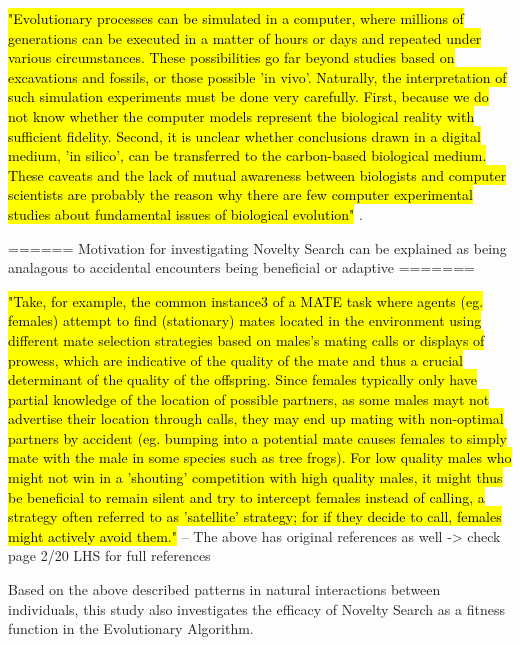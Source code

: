 \hl{"Evolutionary processes can be simulated in a computer, where millions of generations can be executed in a matter of hours or days and repeated under various circumstances. These possibilities go far beyond studies based on excavations and fossils, or those possible 'in vivo'. Naturally, the interpretation of such simulation experiments must be done very carefully. First, because we do not know whether the computer models represent the biological reality with sufficient fidelity. Second, it is unclear whether conclusions drawn in a digital medium, 'in silico', can be transferred to the carbon-based biological medium. These caveats and the lack of mutual awareness between biologists and computer scientists are probably the reason why there are few computer experimental studies about fundamental issues of biological evolution"} \cite{EibenSmith2003}.


====== Motivation for investigating Novelty Search can be explained as being analagous to accidental encounters being beneficial or adaptive =======

\hl{"Take, for example, the common instance3 of a MATE task where agents (eg. females) attempt to find (stationary) mates located in the environment using different mate selection strategies based on males's mating calls or displays of prowess, which are indicative of the quality of the mate and thus a crucial determinant of the quality of the offspring. Since females typically only have partial knowledge of the location of possible partners, as some males mayt not advertise their location through calls, they may end up mating with non-optimal partners by accident (eg. bumping into a potential mate causes females to simply mate with the male in some species such as tree frogs). For low quality males who might not win in a 'shouting' competition with high quality males, it might thus be beneficial to remain silent and try to intercept females instead of calling, a strategy often referred to as 'satellite' strategy; for if they decide to call, females might actively avoid them."} \cite{ferreira2018accidental}
-- The above has original references as well -> check page 2/20 LHS for full references

Based on the above described patterns in natural interactions between individuals, this study also investigates the efficacy of Novelty Search as a fitness function in the Evolutionary Algorithm.



